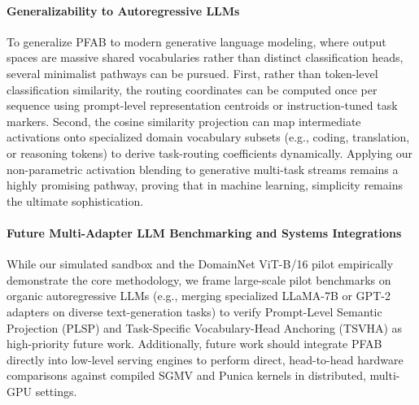 \paragraph{Generalizability to Autoregressive LLMs}
To generalize \textsc{PFAB} to modern generative language modeling, where output spaces are massive shared vocabularies rather than distinct classification heads, several minimalist pathways can be pursued. First, rather than token-level classification similarity, the routing coordinates can be computed once per sequence using prompt-level representation centroids or instruction-tuned task markers. Second, the cosine similarity projection can map intermediate activations onto specialized domain vocabulary subsets (e.g., coding, translation, or reasoning tokens) to derive task-routing coefficients dynamically. Applying our non-parametric activation blending to generative multi-task streams remains a highly promising pathway, proving that in machine learning, simplicity remains the ultimate sophistication.

\paragraph{Future Multi-Adapter LLM Benchmarking and Systems Integrations}
While our simulated sandbox and the DomainNet ViT-B/16 pilot empirically demonstrate the core methodology, we frame large-scale pilot benchmarks on organic autoregressive LLMs (e.g., merging specialized LLaMA-7B or GPT-2 adapters on diverse text-generation tasks) to verify Prompt-Level Semantic Projection (PLSP) and Task-Specific Vocabulary-Head Anchoring (TSVHA) as high-priority future work. Additionally, future work should integrate PFAB directly into low-level serving engines to perform direct, head-to-head hardware comparisons against compiled SGMV and Punica kernels in distributed, multi-GPU settings.


